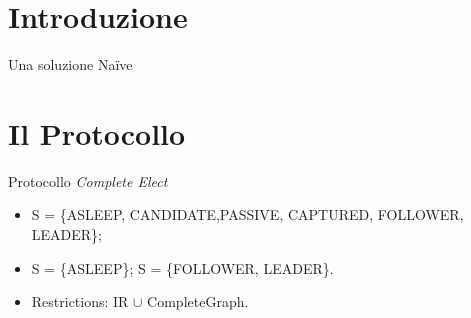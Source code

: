 \section{Introduzione}
\begin{frame}{Una soluzione Na{\"i}ve}




\end{frame}

\section{Il Protocollo}
\begin{frame}{Protocollo \textit{Complete Elect}}


\begin{itemize}
 \item S = \{ASLEEP, CANDIDATE,PASSIVE, CAPTURED, FOLLOWER, LEADER\};
 \item S = \{ASLEEP\}; S = \{FOLLOWER, LEADER\}.
 \item Restrictions: IR $\cup$ CompleteGraph.
\end{itemize}

 
\end{frame}

 
